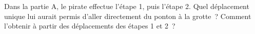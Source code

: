 \documentclass{article}
\begin{document}
\begin{tcolorbox}[colback=orange!5, colframe=orange!70!black, fonttitle=\bfseries, title=Pour aller plus loin]
  Dans la partie A, le pirate effectue l'étape 1, puis l'étape 2. Quel déplacement unique lui aurait permis d'aller directement du ponton à la grotte~? Comment l'obtenir à partir des déplacements des étapes 1 et 2~?

  \medskip
  \dotfill
\end{tcolorbox}
\end{document}
